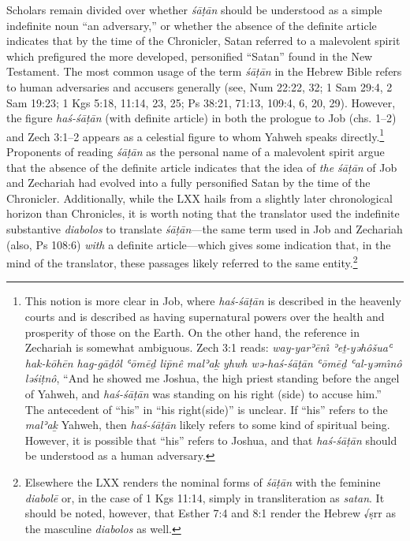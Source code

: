 Scholars remain divided over whether \emph{śāṭān} should be understood
as a simple indefinite noun ``an adversary,''
\autocites{stokes_jbl2009}[114--117]{japhet2009}[370--390]{japhet1993}
or whether the absence of the definite article indicates that by the
time of the Chronicler, Satan referred to a malevolent spirit which
prefigured the more developed, personified ``Satan'' found in the New
Testament.\autocite[4--5]{rollston_keith-stuckenbruck2016} The most
common usage of the term \emph{śāṭān} in the Hebrew Bible refers to
human adversaries and accusers generally (see, Num 22:22, 32; 1 Sam
29:4, 2 Sam 19:23; 1 Kgs 5:18, 11:14, 23, 25; Ps 38:21, 71:13, 109:4, 6,
20, 29). However, the figure \emph{haś-śāṭān} (with definite article) in
both the prologue to Job (chs. 1--2) and Zech 3:1--2 appears as a
celestial figure to whom Yahweh speaks directly.\footnote{This notion is
  more clear in Job, where \emph{haś-śāṭān} is described in the heavenly
  courts and is described as having supernatural powers over the health
  and prosperity of those on the Earth. On the other hand, the reference
  in Zechariah is somewhat ambiguous. Zech 3:1 reads: \emph{way-yarʾēnı̂
  ʾeṯ-yəhôšuaʿ hak-kōhēn hag-gāḏôl ʿōmēḏ lip̄nê malʾaḵ yhwh wə-haś-śāṭān
  ʿōmēḏ ʿal-yəmı̂nô ləśiṭnô}, ``And he showed me Joshua, the high priest
  standing before the angel of Yahweh, and \emph{haś-śāṭān} was standing
  on his right (side) to accuse him.'' The antecedent of ``his'' in
  ``his right(side)'' is unclear. If ``his'' refers to the \emph{malʾaḵ}
  Yahweh, then \emph{haś-śāṭān} likely refers to some kind of spiritual
  being. However, it is possible that ``his'' refers to Joshua, and that
  \emph{haś-śāṭān} should be understood as a human adversary.}
Proponents of reading \emph{śāṭān} as the personal name of a malevolent
spirit argue that the absence of the definite article indicates that the
idea of \emph{the śāṭān} of Job and Zechariah had evolved into a fully
personified Satan by the time of the
Chronicler.\autocites[216--217]{braun1986}[107]{coggins1976}[Rollston
also finds this reading compelling, though, not without difficulties.
See,][4--5]{rollston_keith-stuckenbruck2016} Additionally, while the LXX
hails from a slightly later chronological horizon than Chronicles, it is
worth noting that the translator used the indefinite substantive
\emph{diabolos} to translate \emph{śāṭān}---the same term used in Job
and Zechariah (also, Ps 108:6) \emph{with} a definite article---which
gives some indication that, in the mind of the translator, these
passages likely referred to the same entity.\footnote{Elsewhere the LXX
  renders the nominal forms of \emph{śāṭān} with the feminine
  \emph{diabolē} or, in the case of 1 Kgs 11:14, simply in
  transliteration as \emph{satan}. It should be noted, however, that
  Esther 7:4 and 8:1 render the Hebrew √ṣrr as the masculine
  \emph{diabolos} as well.}

